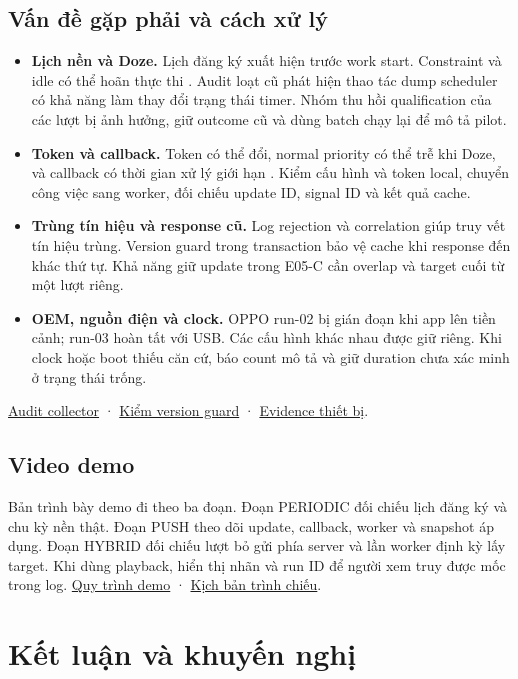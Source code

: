 \documentclass[12pt,a4paper]{report}
\newcommand{\repo}{https://github.com/ThanhTris/Seminar-IE307/blob/db8dc5f}
\newcommand{\source}[2]{\href{\repo/#1}{#2}}
\begin{document}
\section{Vấn đề gặp phải và cách xử lý}
\begin{itemize}
  \setlength{\itemsep}{2pt}
  \item \textbf{Lịch nền và Doze.} Lịch đăng ký xuất hiện trước work start. Constraint và idle có thể hoãn thực thi \citep{AndroidDefineWork,AndroidDozeStandby}. Audit loạt cũ phát hiện thao tác dump scheduler có khả năng làm thay đổi trạng thái timer. Nhóm thu hồi qualification của các lượt bị ảnh hưởng, giữ outcome cũ và dùng batch chạy lại để mô tả pilot.
  \item \textbf{Token và callback.} Token có thể đổi, normal priority có thể trễ khi Doze, và callback có thời gian xử lý giới hạn \citep{FirebaseReceiveMessages,FirebaseAndroidPriority}. Kiểm cấu hình và token local, chuyển công việc sang worker, đối chiếu update ID, signal ID và kết quả cache.
  \item \textbf{Trùng tín hiệu và response cũ.} Log rejection và correlation giúp truy vết tín hiệu trùng. Version guard trong transaction bảo vệ cache khi response đến khác thứ tự. Khả năng giữ update trong E05-C cần overlap và target cuối từ một lượt riêng.
  \item \textbf{OEM, nguồn điện và clock.} OPPO run-02 bị gián đoạn khi app lên tiền cảnh; run-03 hoàn tất với USB. Các cấu hình khác nhau được giữ riêng. Khi clock hoặc boot thiếu căn cứ, báo count mô tả và giữ duration chưa xác minh ở trạng thái trống.
\end{itemize}
\source{docs/evidence/SEM-41/SCHEDULER_OBSERVER_AUDIT.json}{Audit collector} · \source{docs/evidence/SEM-39/CORE_CASES.md}{Kiểm version guard} · \source{docs/evidence/SEM-42/CHECKS.md}{Evidence thiết bị}.

\section{Video demo}
Bản trình bày demo đi theo ba đoạn. Đoạn PERIODIC đối chiếu lịch đăng ký và chu kỳ nền thật. Đoạn PUSH theo dõi update, callback, worker và snapshot áp dụng. Đoạn HYBRID đối chiếu lượt bỏ gửi phía server và lần worker định kỳ lấy target. Khi dùng playback, hiển thị nhãn và run ID để người xem truy được mốc trong log. \source{docs/DEMO_RUNBOOK.md}{Quy trình demo} · \source{slides/DEMO_SCRIPT.md}{Kịch bản trình chiếu}.

\chapter{Kết luận và khuyến nghị}
\end{document}

